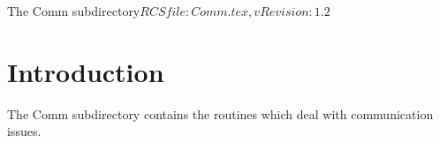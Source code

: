 %   

\begin{cactuspart}{6}{The Comm subdirectory}{$RCSfile: Comm.tex,v $}{$Revision: 1.2 $}
\renewcommand{\thepage}{\Alph{part}\arabic{page}}

\chapter{Introduction}

The Comm subdirectory contains the routines which deal with communication issues.

\end{cactuspart}
